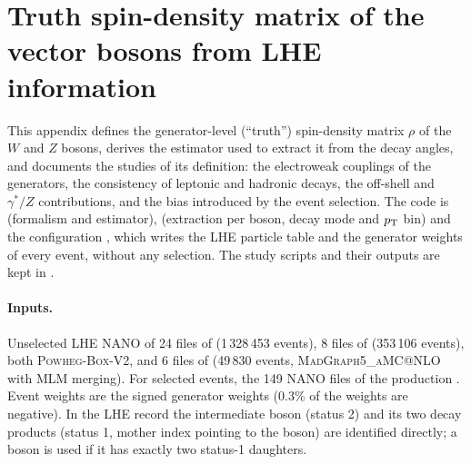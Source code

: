 \section{Truth spin-density matrix of the vector bosons from LHE information}
\label{app:truth}

This appendix defines the generator-level (``truth'') spin-density matrix $\rho$ of the $W$ and $Z$ bosons, derives the
estimator used to extract it from the decay angles, and documents the studies of its definition: the electroweak
couplings of the generators, the consistency of leptonic and hadronic decays, the off-shell and $\gamma^*/Z$
contributions, and the bias introduced by the event selection. The code is  (formalism and
estimator),  (extraction per boson, decay mode and $p_{\mathrm{T}}$ bin) and the configuration
, which writes the LHE particle table and the generator weights of every event,
without any selection. The study scripts and their outputs are kept in .

\paragraph{Inputs.} Unselected LHE NANO of 24 files of  (1\,328\,453 events), 8 files of
 (353\,106 events), both \textsc{Powheg-Box-V2}, and 6 files of 
(49\,830 events, \textsc{MadGraph5\_aMC@NLO} with MLM merging). For selected events, the 149  NANO files of
the production . Event weights are the signed generator weights (0.3\% of the 
weights are negative). In the LHE record the intermediate boson (status 2) and its two decay products (status 1, mother
index pointing to the boson) are identified directly; a boson is used if it has exactly two status-1 daughters.

